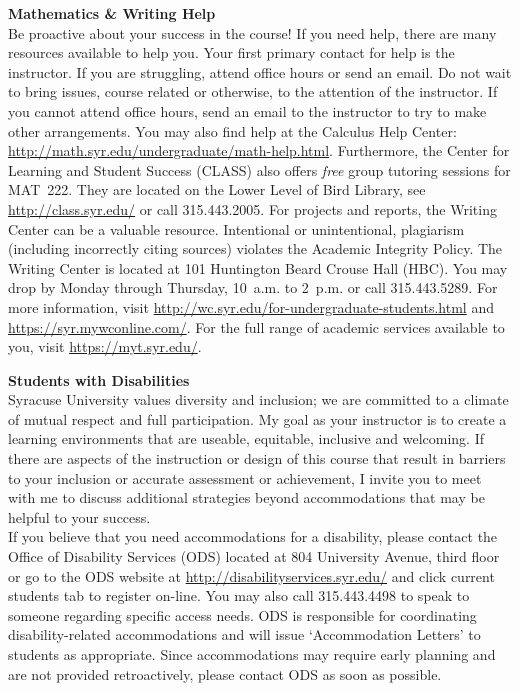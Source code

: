 \documentclass[11pt,letterpaper]{article}
\newcommand{\lefthead}[2]{\noindent\textbf{#1}\hfill\\[#2]}
\begin{document}
\lefthead{Mathematics \& Writing Help}{0.3cm}
\noindent Be proactive about your success in the course!  If you need help, there are many resources available to help you. Your first primary contact for help is the instructor. If you are struggling, attend office hours or send an email. Do not wait to bring issues, course related or otherwise, to the attention of the instructor. If you cannot attend office hours, send an email to the instructor to try to make other arrangements. You may also find help at the Calculus Help Center: \url{http://math.syr.edu/undergraduate/math-help.html}. Furthermore, the Center for Learning and Student Success (CLASS) also offers \emph{free} group tutoring sessions for MAT~222. They are located on the Lower Level of Bird Library, see \url{http://class.syr.edu/} or call  315.443.2005. For projects and reports, the Writing Center can be a valuable resource. Intentional or unintentional, plagiarism (including incorrectly citing sources) violates the Academic Integrity Policy. The Writing Center is located at 101 Huntington Beard Crouse Hall (HBC). You may drop by Monday through Thursday, 10~a.m. to 2~p.m. or call 315.443.5289. For more information, visit \url{http://wc.syr.edu/for-undergraduate-students.html} and \url{https://syr.mywconline.com/}. For the full range of academic services available to you, visit \url{https://myt.syr.edu/}. \\[0.3cm]





\newpage





\lefthead{Students with Disabilities}{0.3cm}
\noindent Syracuse University values diversity and inclusion; we are committed to a climate of mutual respect and full participation. My goal as your instructor is to create a learning environments that are useable, equitable, inclusive and welcoming. If there are aspects of the instruction or design of this course that result in barriers to your inclusion or accurate assessment or achievement, I invite you to meet with me to discuss additional strategies beyond accommodations that may be helpful to your success. \\

\noindent If you believe that you need accommodations for a disability, please contact the Office of Disability Services (ODS) located at 804 University Avenue, third floor or go to the ODS website at \url{http://disabilityservices.syr.edu/} and click current students tab to register on-line. You may also call 315.443.4498 to speak to someone regarding specific access needs. ODS is responsible for coordinating disability-related accommodations and will issue `Accommodation Letters' to students as appropriate. Since accommodations may require early planning and are not provided retroactively, please contact ODS as soon as possible. \\[0.3cm]
\end{document}
